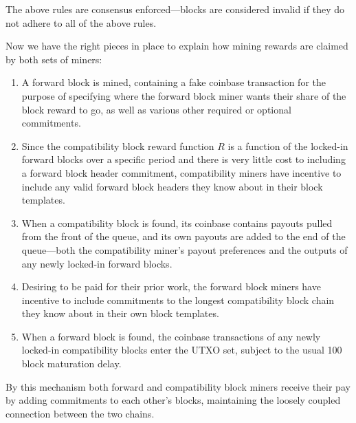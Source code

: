 The above rules are consensus enforced---blocks are considered invalid
if they do not adhere to all of the above rules.

Now we have the right pieces in place to explain how mining rewards
are claimed by both sets of miners:

\begin{enumerate}
  \item
    A forward block is mined, containing a fake coinbase transaction
    for the purpose of specifying where the forward block miner wants
    their share of the block reward to go, as well as various other
    required or optional commitments.

  \item
    Since the compatibility block reward function $R$ is a function of
    the locked-in forward blocks over a specific period and there is
    very little cost to including a forward block header commitment,
    compatibility miners have incentive to include any valid forward
    block headers they know about in their block templates.

  \item
    When a compatibility block is found, its coinbase contains payouts
    pulled from the front of the queue, and its own payouts are added
    to the end of the queue---both the compatibility miner's payout
    preferences and the outputs of any newly locked-in forward blocks.

  \item
    Desiring to be paid for their prior work, the forward block miners
    have incentive to include commitments to the longest compatibility
    block chain they know about in their own block templates.

  \item
    When a forward block is found, the coinbase transactions of any
    newly locked-in compatibility blocks enter the UTXO set, subject
    to the usual \num{100} block maturation delay.
\end{enumerate}

By this mechanism both forward and compatibility block miners receive
their pay by adding commitments to each other's blocks, maintaining
the loosely coupled connection between the two chains.

